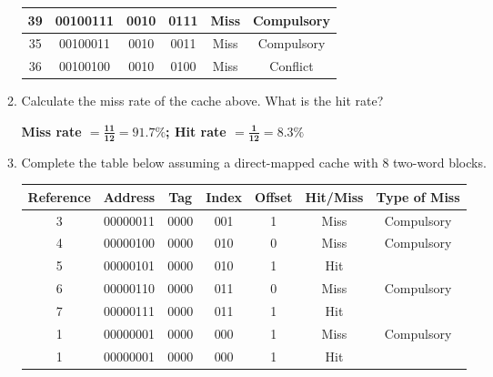 \documentclass{article}
\begin{document}
\begin{enumerate}
\begin{enumerate}
\begin{table}[ht]
\begin{tabular}{|c|c|c|c|c|c|}
39                 & 00100111         & 0010         & 0111           & Miss              & Compulsory            \\ \hline
35                 & 00100011         & 0010         & 0011           & Miss              & Compulsory            \\ \hline
36                 & 00100100         & 0010         & 0100           & Miss              & Conflict              \\ \hline
\end{tabular}
\egroup
\end{table}
    \item Calculate the miss rate of the cache above. What is the hit rate?\par
    \textbf{Miss rate $\bm{=\frac{11}{12}=91.7\%}$; Hit rate $\bm{=\frac{1}{12}=8.3\%}$}
    \item Complete the table below assuming a direct-mapped cache with 8 two-word blocks.
\begin{table}[ht]
\centering
\def\arraystretch{1.5}
\begin{tabular}{|c|c|c|c|c|c|c|}
\hline
\textbf{Reference} & \textbf{Address} & \textbf{Tag} & \textbf{Index} & \textbf{Offset} & \textbf{Hit/Miss} & \textbf{Type of Miss} \\ \hline
3                  & 00000011         & 0000         & 001            & 1               & Miss              & Compulsory            \\ \hline
4                  & 00000100         & 0000         & 010            & 0               & Miss              & Compulsory            \\ \hline
5                  & 00000101         & 0000         & 010            & 1               & Hit               &                       \\ \hline
6                  & 00000110         & 0000         & 011            & 0               & Miss              & Compulsory            \\ \hline
7                  & 00000111         & 0000         & 011            & 1               & Hit               &                       \\ \hline
1                  & 00000001         & 0000         & 000            & 1               & Miss              & Compulsory            \\ \hline
1                  & 00000001         & 0000         & 000            & 1               & Hit               &                       \\ \hline

\end{tabular}
\end{table}
\end{enumerate}
\end{enumerate}
\end{document}
